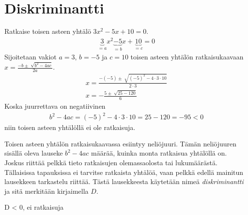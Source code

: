 \section{Diskriminantti}

\begin{esimerkki}
    Ratkaise toisen asteen yhtälö $3x^2-5x+10=0$.
    \begin{align*}
        \underbrace{3}_{=a}x^2\underbrace{-5}_{=b}x+\underbrace{10}_{=c}=0
    \end{align*}
    Sijoitetaan vakiot $a=3$, $b=-5$ ja $c=10$ toisen asteen yhtälön ratkaisukaavaan $x=\frac{-b \pm \sqrt[]{b^2-4ac}}{2a}$.
    \begin{align*}
        x=\frac{-(-5) \pm \sqrt[]{(-5)^2-4\cdot 3 \cdot 10}}{2 \cdot 3} \\
        x=-\frac{5 \pm \sqrt[]{25-120}}{6}
    \end{align*}
    Koska juurrettava on negatiivinen
    \begin{align*}
        b^2-4ac=(-5)^2-4 \cdot 3 \cdot 10=25-120=-95<0
    \end{align*}
    niin toisen asteen yhtälöllä ei ole ratkaisuja.
\end{esimerkki}


Toisen asteen yhtälön ratkaisukaavassa esiintyy neliöjuuri. Tämän neliöjuuren sisällä oleva lauseke $b^2-4ac$ määrää, kuinka monta ratkaisua yhtälöllä on. Joskus riittää pelkkä tieto ratkaisujen olemassaolosta tai lukumäärästä. Tällaisissa tapauksissa ei tarvitse ratkaista yhtälöä, vaan pelkkä edellä mainitun lausekkeen tarkastelu riittää. Tästä lausekkeesta käytetään nimeä \emph{diskriminantti} ja sitä merkitään kirjaimella $D$.


D < 0, ei ratkaisuja
\begin{kuvaajapohja}{1}{-1}{3}{-1}{3}
\end{kuvaajapohja}

